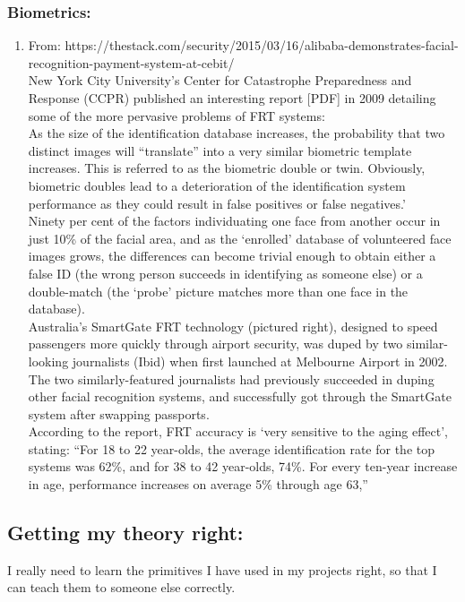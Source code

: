 \documentclass[11pt]{article}
\begin{document}
\subsubsection*{Biometrics:}
\begin{enumerate}
 \item From: https://thestack.com/security/2015/03/16/alibaba-demonstrates-facial-recognition-payment-system-at-cebit/\\
 New York City University’s Center for Catastrophe Preparedness and Response (CCPR) published an interesting report [PDF] in 2009 detailing some of 
the more pervasive problems of FRT systems:\\
As the size of the identification database increases, the probability that two distinct images will “translate” into a very similar biometric template 
increases. This is referred to as the biometric double or twin. Obviously, biometric doubles lead to a deterioration of the identification system 
performance as they could result in false positives or false negatives.’\\

Ninety per cent of the factors individuating one face from another occur in just 10\% of the facial area, and as the ‘enrolled’ database of 
volunteered face images grows, the differences can become trivial enough to obtain either a false ID (the wrong person succeeds in identifying as 
someone else) or a double-match (the ‘probe’ picture matches more than one face in the database).\\

Australia’s SmartGate FRT technology (pictured right), designed to speed passengers more quickly through airport security, was duped by two 
similar-looking journalists (Ibid) when first launched at Melbourne Airport in 2002. The two similarly-featured journalists had previously succeeded 
in duping other facial recognition systems, and successfully got through the SmartGate system after swapping passports.\\

According to the report, FRT accuracy is ‘very sensitive to the aging effect’, stating: “For 18 to 22 year-olds, the average identification rate for 
the top systems was 62\%, and for 38 to 42 year-olds, 74\%. For every ten-year increase in age, performance increases on average 5\% through age 63,”
\end{enumerate}

\subsection*{Getting my theory right:}
I really need to learn the primitives I have used in my  projects right, so that I can teach them to someone else correctly.\\
\end{document}
